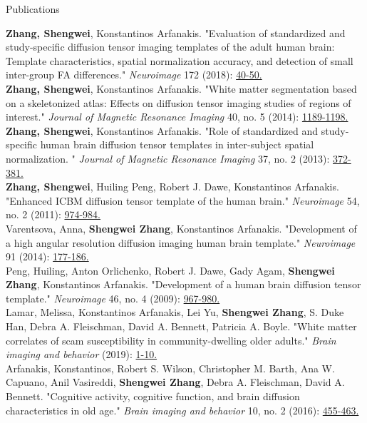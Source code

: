 \documentclass{resume} %
\begin{document}
\begin{rSection}{Publications}

	{\bf Zhang, Shengwei}, Konstantinos Arfanakis. "Evaluation of standardized and study-specific diffusion tensor imaging templates of the adult human brain: Template characteristics, spatial normalization accuracy, and detection of small inter-group FA differences." {\em Neuroimage} 172 (2018): \href{https://doi.org/10.1016/j.neuroimage.2018.01.046}{40-50.}\\
	{\bf Zhang, Shengwei}, Konstantinos Arfanakis. "White matter segmentation based on a skeletonized atlas: Effects on diffusion tensor imaging studies of regions of interest." {\em Journal of Magnetic Resonance Imaging} 40, no. 5 (2014): \href{https://doi.org/10.1002/jmri.24445}{1189-1198.}\\
	{\bf Zhang, Shengwei}, Konstantinos Arfanakis. "Role of standardized and study‐specific human brain diffusion tensor templates in inter‐subject spatial normalization. " {\em Journal of Magnetic Resonance Imaging} 37, no. 2 (2013): \href{https://doi.org/10.1002/jmri.23842}{372-381.}\\
	{\bf Zhang, Shengwei}, Huiling Peng, Robert J. Dawe, Konstantinos Arfanakis. "Enhanced ICBM diffusion tensor template of the human brain." {\em Neuroimage} 54, no. 2 (2011): \href{https://doi.org/10.1016/j.neuroimage.2010.09.008}{974-984.}\\
	Varentsova, Anna,  {\bf Shengwei Zhang}, Konstantinos Arfanakis. "Development of a high angular resolution diffusion imaging human brain template." {\em Neuroimage} 91 (2014): \href{https://doi.org/10.1016/j.neuroimage.2014.01.009}{177-186.}\\
	Peng, Huiling, Anton Orlichenko, Robert J. Dawe, Gady Agam, {\bf Shengwei Zhang}, Konstantinos Arfanakis. "Development of a human brain diffusion tensor template." {\em Neuroimage} 46, no. 4 (2009): \href{https://doi.org/10.1016/j.neuroimage.2009.03.046}{967-980.}\\
	Lamar, Melissa, Konstantinos Arfanakis, Lei Yu, {\bf Shengwei Zhang}, S. Duke Han, Debra A. Fleischman, David A. Bennett, Patricia A. Boyle. "White matter correlates of scam susceptibility in community-dwelling older adults." {\em Brain imaging and behavior} (2019): \href{https://doi.org/10.1007/s11682-019-00079-7}{1-10.}\\
	Arfanakis, Konstantinos, Robert S. Wilson, Christopher M. Barth, Ana W. Capuano, Anil Vasireddi, {\bf Shengwei Zhang}, Debra A. Fleischman, David A. Bennett. "Cognitive activity, cognitive function, and brain diffusion characteristics in old age." {\em Brain imaging and behavior} 10, no. 2 (2016): \href{https://doi.org/10.1007/s11682-015-9405-5}{455-463.}\\

\end{rSection}
\end{document}
